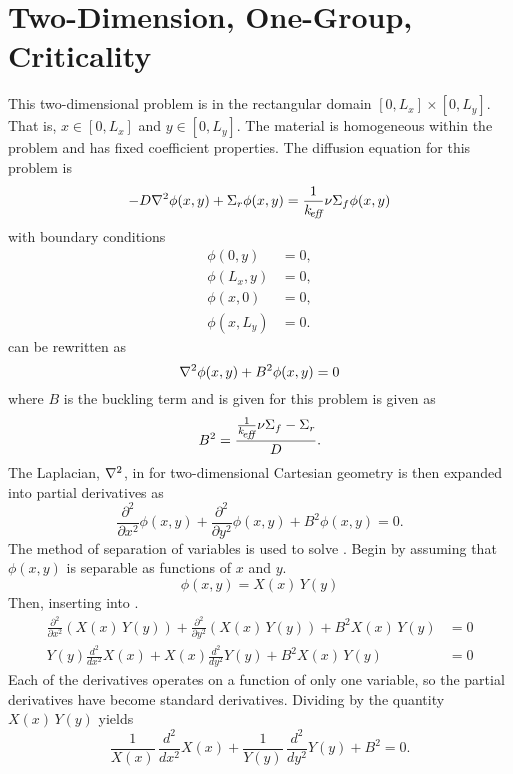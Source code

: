 \section{Two-Dimension, One-Group, Criticality}
  \label{sec:deriv_2d1g}
  This two-dimensional problem is in the rectangular domain $[0,L_x] \times
  [0,L_y]$. That is, $x \in [0,L_x]$ and $y \in [0,L_y]$. The material is
  homogeneous within the problem and has fixed coefficient properties. The
  diffusion equation for this problem is 
  \begin{equation}
    \label{eq:2d1g}
    -D \mathbf{\nabla}^2 \phi(x,y) + \Sigma_r \phi(x,y) = 
      \frac{1}{k_{\!\mbox{\scriptsize \em eff}}} \nu \Sigma_f \phi(x,y)
  \end{equation}
  with boundary conditions
  \begin{align}
    \label{eq:2d1g_bc1}
    \phi(0,y) &= 0 ,\\
    \label{eq:2d1g_bc2}
    \phi(L_x,y) &= 0 ,\\
    \label{eq:2d1g_bc3}
    \phi(x,0) &= 0 ,\\
    \label{eq:2d1g_bc4}
    \phi(x,L_y) &= 0.
  \end{align}
   can be rewritten as
  \begin{equation}
    \label{eq:2d1g_buckle}
    \mathbf{\nabla}^2 \phi(x,y) + B^2 \phi(x,y) = 0
  \end{equation}
  where $B$ is the buckling term and is given for this problem is given as
  \begin{equation}
    \label{eq:2d1g_b2}
    B^2 = \frac{\frac{1}{k_{\!\mbox{\scriptsize \em eff}}} \nu \Sigma_f - \Sigma_r}{D}.
  \end{equation}
  The Laplacian, $\mathbf{\nabla}^2$, in  for two-dimensional 
  Cartesian geometry is then expanded into partial derivatives as
  \begin{equation}
    \label{eq:2d1g_partial}
    \frac{\partial^2}{\partial x^2} \phi(x,y) + \frac{\partial^2}{\partial y^2}
      \phi(x,y) + B^2 \phi(x,y) = 0.
  \end{equation}
  The method of separation of variables is used to solve
  . Begin by assuming that $\phi(x,y)$ is separable as
  functions of $x$ and $y$.
  \begin{equation}
    \label{eq:2d1g_separable}
    \phi(x,y) = X(x)\,Y(y)
  \end{equation}
  Then, inserting  into .
  \begin{align}
    \frac{\partial^2}{\partial x^2} \left( X(x)\,Y(y) \right) + 
      \frac{\partial^2}{\partial y^2} \left( X(x)\,Y(y) \right) + 
      B^2 X(x)\,Y(y) &= 0 \\
    \label{eq:2d1g_above}
    Y(y) \frac{d^2}{d x^2} X(x) + X(x) \frac{d^2}{d y^2} Y(y) + 
      B^2 X(x) \, Y(y) &= 0
  \end{align}
  Each of the derivatives operates on a function of only one variable, so the
  partial derivatives have become standard derivatives. Dividing by the quantity 
  $X(x)\,Y(y)$ yields
  \begin{equation}
    \label{eq:2d1g_divide_sum}
    \frac{1}{X(x)} \, \frac{d^2}{d x^2} X(x) + 
      \frac{1}{Y(y)} \, \frac{d^2}{d y^2} Y(y) + 
      B^2 = 0.
  \end{equation}

